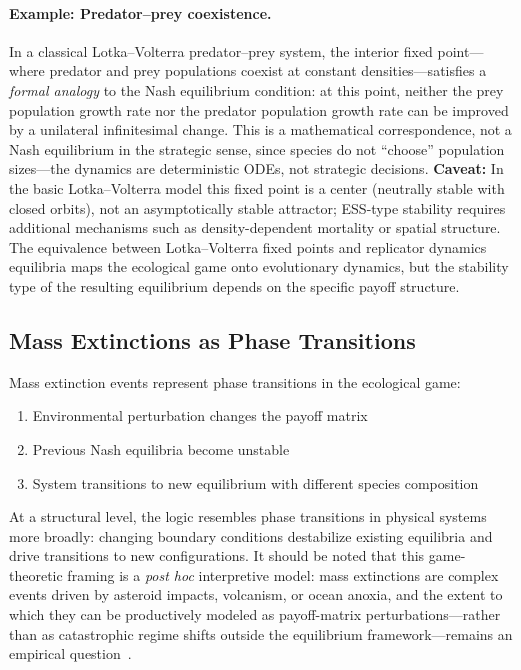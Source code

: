 \documentclass[12pt,a4paper]{article}
\theoremstyle{remark}
\begin{document}
\paragraph{Example: Predator--prey coexistence.}
In a classical Lotka--Volterra predator--prey system, the interior fixed point---where predator and prey populations coexist at constant densities---satisfies a \emph{formal analogy} to the Nash equilibrium condition: at this point, neither the prey population growth rate nor the predator population growth rate can be improved by a unilateral infinitesimal change. This is a mathematical correspondence, not a Nash equilibrium in the strategic sense, since species do not ``choose'' population sizes---the dynamics are deterministic ODEs, not strategic decisions. \textbf{Caveat:} In the basic Lotka--Volterra model this fixed point is a center (neutrally stable with closed orbits), not an asymptotically stable attractor; ESS-type stability requires additional mechanisms such as density-dependent mortality or spatial structure. The equivalence between Lotka--Volterra fixed points and replicator dynamics equilibria \citep[Chapter~7]{HofbauerSigmund1998} maps the ecological game onto evolutionary dynamics, but the stability type of the resulting equilibrium depends on the specific payoff structure.

\subsection{Mass Extinctions as Phase Transitions}

Mass extinction events represent phase transitions in the ecological game:
\begin{enumerate}
    \item Environmental perturbation changes the payoff matrix
    \item Previous Nash equilibria become unstable
    \item System transitions to new equilibrium with different species composition
\end{enumerate}

At a structural level, the logic resembles phase transitions in physical systems more broadly: changing boundary conditions destabilize existing equilibria and drive transitions to new configurations. It should be noted that this game-theoretic framing is a \emph{post hoc} interpretive model: mass extinctions are complex events driven by asteroid impacts, volcanism, or ocean anoxia, and the extent to which they can be productively modeled as payoff-matrix perturbations---rather than as catastrophic regime shifts outside the equilibrium framework---remains an empirical question~\citep{GouldEldredge1977}.
\end{document}
